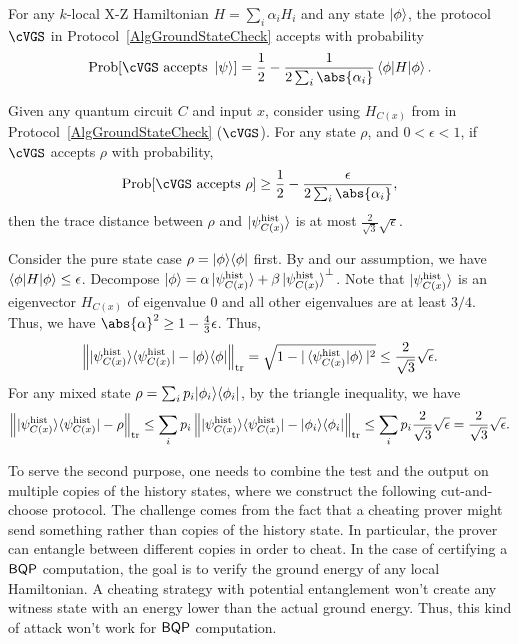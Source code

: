 \begin{lem}
    \label{thm:HamCheck}
    For any $k$-local X-Z Hamiltonian $H=\sum_i \alpha_{i} H_i$ and any state $\ket{\phi}$,
    the protocol $\cVGS$ in Protocol~\ref{AlgGroundStateCheck} accepts with
    probability
\begin{equation}
 \mathrm{Prob}[ \cVGS \text{ accepts } \ket{\psi}] = \frac{1}{2} - \frac{1}{2 \sum_i \abs{\alpha_i}}\braket{\phi|H|\phi}.
\end{equation}
\end{lem}

\begin{theorem} \label{thm:HamCheckClose}
Given any quantum circuit $C$ and input $x$, consider using $H_{C(x)}$ from  in Protocol~\ref{AlgGroundStateCheck} ($\cVGS$).
For any state $\rho$, and $0< \epsilon < 1$, if $\cVGS$ accepts $\rho$ with probability,
\[
 \mathrm{Prob}[\cVGS \text{ accepts } \rho] \geq \frac{1}{2} - \frac{\epsilon}{2 \sum_i \abs{\alpha_i}},
\]
then the trace distance between $\rho$ and $\ket{\psi_{C(x)}^{\mathrm{hist}}}$ is at most $\frac{2}{\sqrt{3}}\sqrt{\epsilon}$.
\end{theorem}

\begin{prf} Consider the pure state case $\rho=|\phi\rangle\langle \phi|$ first. By  and our assumption, we have $\braket{\phi|H|\phi} \leq \epsilon$.
Decompose $\ket{\phi}= \alpha \ket{\psi_{C(x)}^{\mathrm{hist}}} + \beta \ket{\psi_{C(x)}^{\mathrm{hist}}}^\bot$. Note that $\ket{\psi_{C(x)}^{\mathrm{hist}}}$ is an eigenvector $H_{C(x)}$ of eigenvalue 0 and all other eigenvalues are at least $3/4$. Thus, we have $\abs{\alpha}^2 \geq 1-\frac{4}{3}\epsilon$. Thus,
\[
   \left\lVert|\psi^{\mathrm{hist}}_{C(x)}\rangle\langle \psi^{\mathrm{hist}}_{C(x)}|- |\phi\rangle\langle \phi|\right\rVert_{\operatorname{tr}} = \sqrt{1- |\braket{\psi^{\mathrm{hist}}_{C(x)}|\phi}|^2}
   \leq \frac{2}{\sqrt{3}}\sqrt{\epsilon}.
\]
For any mixed state $\rho=\sum_i p_i |\phi_i\rangle\langle \phi_i|$, by the triangle inequality, we have
\[
    \left\lVert|\psi^{\mathrm{hist}}_{C(x)}\rangle\langle \psi^{\mathrm{hist}}_{C(x)}|- \rho\right\rVert_{\operatorname{tr}} \leq \sum_i p_i    \left\lVert|\psi^{\mathrm{hist}}_{C(x)}\rangle\langle \psi^{\mathrm{hist}}_{C(x)}|- |\phi_i\rangle\langle \phi_i|\right\rVert_{\operatorname{tr}} \leq \sum_i p_i \frac{2}{\sqrt{3}} \sqrt{\epsilon} =\frac{2}{\sqrt{3}}\sqrt{\epsilon}.
\]
\end{prf}

To serve the second purpose, one needs to combine the test and the output on multiple copies of the history states, where we construct the following cut-and-choose protocol.  
The challenge comes from the fact that a cheating prover might send something rather than copies of the history state.
In particular, the prover can entangle between different copies in order to cheat.
In the case of certifying a $\operatorname{\mathsf{BQP}}$ computation, the goal is to verify the ground energy of any local Hamiltonian.
A cheating strategy with potential entanglement won't create any witness state with an energy lower than the actual ground energy.
Thus, this kind of attack won't work for $\operatorname{\mathsf{BQP}}$ computation.

